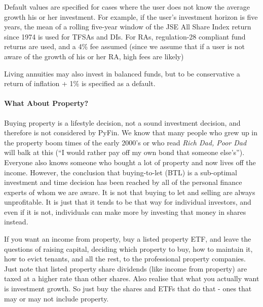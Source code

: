 \documentclass[a4paper, justified]{tufte-handout}
\begin{document}
Default values are specified for cases where the user does not know the average growth his or her investment. For example, if the user's investment horizon is five years, the mean of a rolling five-year window of the JSE All Share Index return since 1974 is used for TFSAs and DIs. For RAs, regulation-28 compliant fund returns are used, and a 4\% fee assumed (since we assume that if a user is not aware of the growth of his or her RA, high fees are likely)

Living annuities may also invest in balanced funds, but to be conservative a return of inflation + 1\% is specified as a default.

\paragraph{What About Property?}
Buying property is a lifestyle decision, not a sound investment decision, and therefore is not considered by PyFin. We know that many people who grew up in the property boom times of the early 2000's or who read \textit{Rich Dad, Poor Dad} will balk at this (``I would rather pay off my own bond that someone else's''). Everyone also knows someone who bought a lot of property and now lives off the income. However, the conclusion that buying-to-let (BTL) is a sub-optimal investment and time decision has been reached by all of the personal finance experts of whom we are aware. It is not that buying to let and selling are always unprofitable. It is just that it tends to be that way for individual investors, and even if it is not, individuals can make more by investing that money in shares instead. 

If you want an income from property, buy a listed property ETF, and leave the questions of raising capital, deciding which property to buy, how to maintain it, how to evict tenants, and all the rest, to the professional property companies. Just note that listed property share dividends (like income from property) are taxed at a higher rate than other shares. Also realise that what you actually want is investment growth. So just buy the shares and ETFs that do that - ones that may or may not include property.
\end{document}
